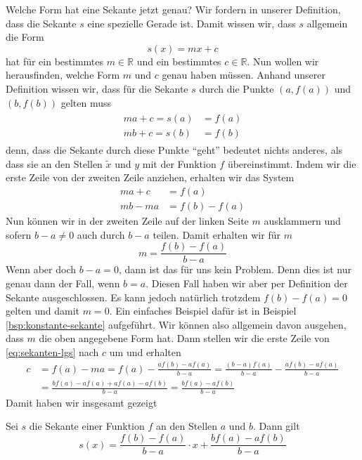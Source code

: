 Welche Form hat eine Sekante jetzt genau? Wir fordern in unserer Definition, dass die Sekante \(s\) eine spezielle Gerade ist. Damit wissen wir, dass \(s\) allgemein die Form 
\begin{equation*}
    s(x) = mx + c
\end{equation*}
hat für ein bestimmtes \(m \in \mathbb R\) und ein bestimmtes \(c \in \mathbb R\). Nun wollen wir herausfinden, welche Form \(m\) und \(c\) genau haben müssen. Anhand unserer Definition wissen wir, dass für die Sekante \(s\) durch die Punkte \((a, f(a))\) und \((b,f(b))\) gelten muss 
\begin{align}
    \begin{split}\label{eq:sekanten-lgs}
        m a + c = s(a) &= f(a) \\
        m b + c = s(b) &= f(b)
    \end{split}
\end{align}
denn, dass die Sekante durch diese Punkte "`geht"' bedeutet nichts anderes, als dass sie an den Stellen \(\tilde x\) und \(y\) mit der Funktion \(f\) übereinstimmt. Indem wir die erste Zeile von der zweiten Zeile anziehen, erhalten wir das System
\begin{align*}
    m a + c &= f(a) \\
    mb - ma &= f(b) - f(a)
\end{align*}
Nun können wir in der zweiten Zeile auf der linken Seite \(m\) ausklammern und sofern \(b - a \neq 0\) auch durch \(b - a\) teilen. Damit erhalten wir für \(m\)
\begin{equation*}
    m = \frac{f(b) - f(a)}{b-a}
\end{equation*}
Wenn aber doch \(b - a = 0\), dann ist das für uns kein Problem. Denn dies ist nur genau dann der Fall, wenn \(b=a\). Diesen Fall haben wir aber per Definition der Sekante ausgeschlossen. Es kann jedoch natürlich trotzdem \(f(b) - f(a) = 0\) gelten und damit \(m=0\). Ein einfaches Beispiel dafür ist in Beispiel \ref{bsp:konstante-sekante} aufgeführt. Wir können also allgemein davon ausgehen, dass \(m\) die oben angegebene Form hat. Dann stellen wir die erste Zeile von \eqref{eq:sekanten-lgs} nach \(c\) um und erhalten 
\begin{align*}
    c &= f(a) - ma = f(a) - \frac{af(b) - af(a)}{b-a} = \frac{(b-a)f(a)}{b-a} - \frac{af(b) - af(a)}{b-a} \\ 
    &= \frac{bf(a) - af(a) + af(a) - af(b)}{b-a} = \frac{bf(a) - af(b)}{b-a}
\end{align*}
Damit haben wir insgesamt gezeigt
\begin{proposition}\label{prop:form-der-sekante}
    Sei \(s\) die Sekante einer Funktion \(f\) an den Stellen \(a\) und \(b\). Dann gilt 
    \begin{equation*}
        s(x) = \frac{f(b) - f(a)}{b-a}\cdot x + \frac{bf(a) - af(b)}{b-a}
    \end{equation*}
\end{proposition}

